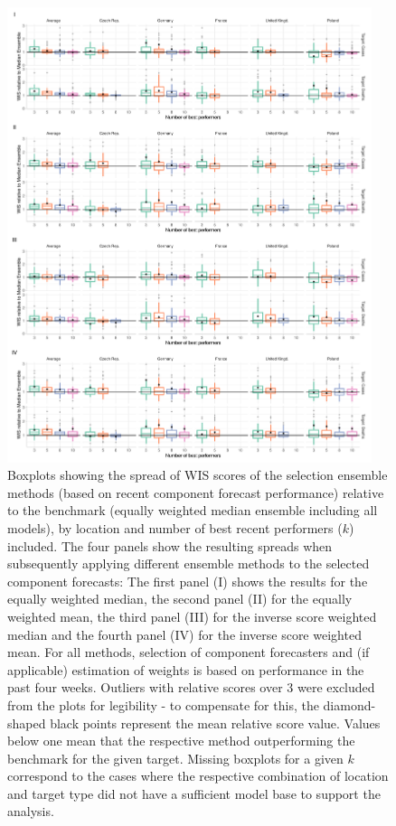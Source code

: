 \begin{figure}
\centering
\includegraphics[width = 0.95\textwidth]{../plots/best_performers_boxplot}
\caption{\footnotesize{Boxplots showing the spread of WIS scores of the selection ensemble methods (based on recent component forecast performance) relative to the benchmark (equally weighted median ensemble including all models), by location and number of best recent performers ($k$) included. The four panels show the resulting spreads when subsequently applying different ensemble methods to the selected component forecasts: The first panel (I) shows the results for the equally weighted median, the second panel (II) for the equally weighted mean, the third panel (III) for the inverse score weighted median and the fourth panel (IV) for the inverse score weighted mean. For all methods, selection of component forecasters and (if applicable) estimation of weights is based on performance in the past four weeks. Outliers with relative scores over 3 were excluded from the plots for legibility - to compensate for this, the diamond-shaped black points represent the mean relative score value. Values below one mean that the respective method outperforming the benchmark for the given target. Missing boxplots for a given $k$ correspond to the cases where the respective combination of location and target type did not have a sufficient model base to support the analysis.}}
\label{ref:best_perform_boxplot}
\end{figure}
